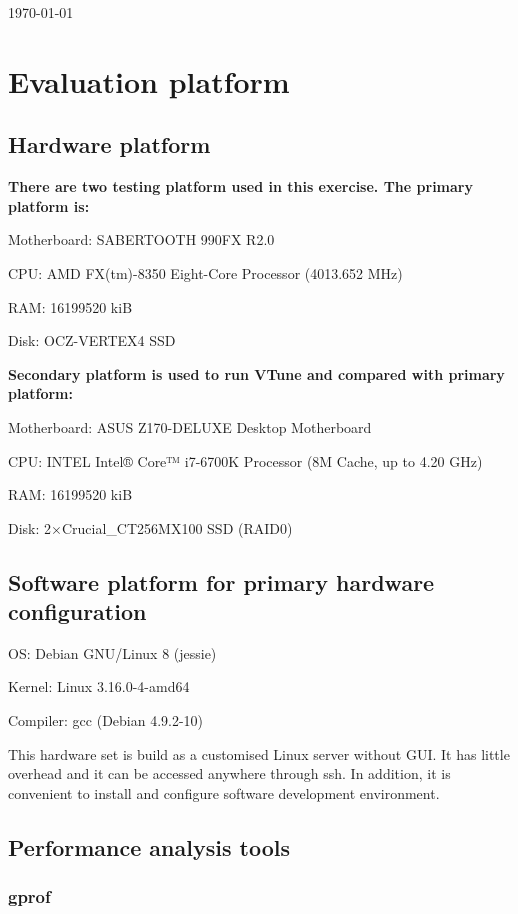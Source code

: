 \documentclass[conference]{IEEEtran}
\begin{document}
\hfill \today

\section{Evaluation platform}

\subsection{Hardware platform}

\textbf{There are two testing platform used in this exercise. The primary platform is:}

Motherboard:    SABERTOOTH 990FX R2.0

CPU:    AMD FX(tm)-8350 Eight-Core Processor (4013.652 MHz)

RAM:    16199520 kiB

Disk:    OCZ-VERTEX4 SSD

\textbf{Secondary platform is used to run VTune and compared with primary platform:}

Motherboard:    ASUS Z170-DELUXE Desktop Motherboard

CPU:    INTEL Intel® Core™ i7-6700K Processor (8M Cache, up to 4.20 GHz)

RAM:    16199520 kiB

Disk:    2$\times$Crucial\_CT256MX100 SSD (RAID0)
\subsection{Software platform for primary hardware configuration}

OS:    Debian GNU/Linux 8 (jessie)

Kernel:    Linux 3.16.0-4-amd64

Compiler:    gcc (Debian 4.9.2-10)

This hardware set is build as a customised Linux server without GUI. It has little overhead and it can be accessed anywhere through ssh. In addition, it is convenient to install and configure software development environment.

\subsection{Performance analysis tools}

\subsubsection{gprof}
\end{document}
